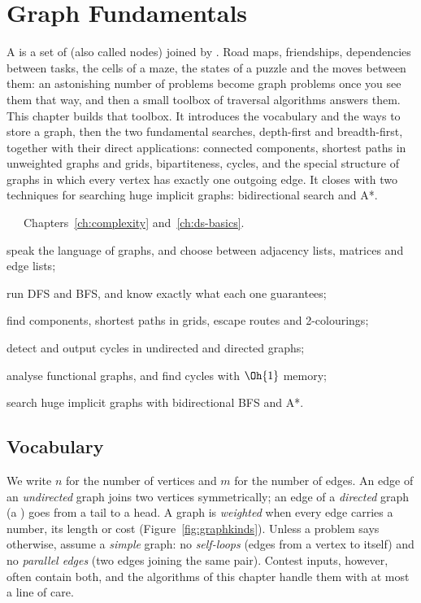 \chapter{Graph Fundamentals}\label{ch:graphs}

A  is a set of  (also called nodes) joined by . Road maps, friendships, dependencies
between tasks, the cells of a maze, the states of a puzzle and the moves between them: an astonishing number of problems
become graph problems once you see them that way, and then a small toolbox of traversal algorithms answers them. This
chapter builds that toolbox. It introduces the vocabulary and the ways to store a graph, then the two fundamental searches,
depth-first and breadth-first, together with their direct applications: connected components, shortest paths in unweighted
graphs and grids, bipartiteness, cycles, and the special structure of graphs in which every vertex has exactly one outgoing
edge. It closes with two techniques for searching huge implicit graphs: bidirectional search and A*.

\begin{chapterintro}{\bronze\ \silver\ \gold\ \ioi}{Chapters~\ref{ch:complexity} and~\ref{ch:ds-basics}.}
  \item speak the language of graphs, and choose between adjacency lists, matrices and edge lists;
  \item run DFS and BFS, and know exactly what each one guarantees;
  \item find components, shortest paths in grids, escape routes and 2-colourings;
  \item detect and output cycles in undirected and directed graphs;
  \item analyse functional graphs, and find cycles with $\Oh{1}$ memory;
  \item search huge implicit graphs with bidirectional BFS and A*.
\end{chapterintro}

\section[Vocabulary]{Vocabulary \hfill \bronze}\label{sec:graph-vocab}

We write $n$ for the number of vertices and $m$ for the number of edges. An edge of an \emph{undirected} graph joins two
vertices symmetrically; an edge of a \emph{directed} graph (a ) goes from a tail to a head. A graph is
\emph{weighted} when every edge carries a number, its length or cost (Figure~\ref{fig:graphkinds}). Unless a problem says
otherwise, assume a \emph{simple} graph: no \emph{self-loops} (edges from a vertex to itself) and no \emph{parallel edges}
(two edges joining the same pair). Contest inputs, however, often contain both, and the algorithms of this chapter handle
them with at most a line of care.

